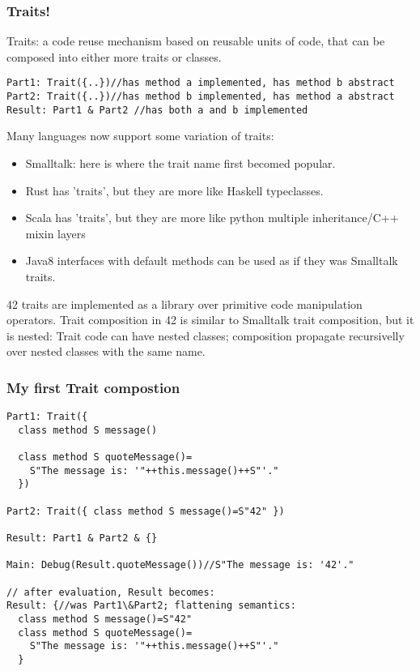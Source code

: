 \begin{frame}[fragile]
\frametitle{Traits!}
Traits: a code reuse mechanism based on reusable
units of code, that can be composed into either more traits or classes.

\begin{NiceCode}{59ex}{0.8}
\begin{lstlisting}
Part1: Trait({..})//has method a implemented, has method b abstract
Part2: Trait({..})//has method b implemented, has method a abstract
Result: Part1 & Part2 //has both a and b implemented
\end{lstlisting}
\end{NiceCode}

Many languages now support some variation of traits: 
\begin{itemize}
\item Smalltalk: here is where the trait name first becomed popular.
\item Rust has 'traits', but they are more like Haskell typeclasses.
\item Scala has 'traits', but they are more like python multiple inheritance/C++ mixin layers
\item Java8 interfaces with default methods can be used as if they was Smalltalk traits.
\end{itemize}
42 traits are implemented as a library over primitive code manipulation operators.
Trait composition in 42 is similar to Smalltalk trait composition, but it is nested: 
Trait code can have nested classes; composition propagate recursivelly over nested classes with the same name. 
\end{frame}



\begin{frame}[fragile]
\frametitle{My first Trait compostion}
\begin{NiceCode}{59ex}{0.8}
\begin{lstlisting}
Part1: Trait({
  class method S message()

  class method S quoteMessage()=
    S"The message is: '"++this.message()++S"'."
  })

Part2: Trait({ class method S message()=S"42" })

Result: Part1 & Part2 & {}

Main: Debug(Result.quoteMessage())//S"The message is: '42'."

// after evaluation, Result becomes: 
Result: {//was Part1\&Part2; flattening semantics: 
  class method S message()=S"42"
  class method S quoteMessage()=
    S"The message is: '"++this.message()++S"'."
  }
\end{lstlisting}
\end{NiceCode}
\end{frame}





